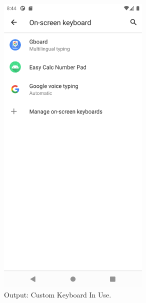 \documentclass[12pt, a4]{article}
\begin{document}
\subsection*{}
\begin{figure}[h]
\centering
\caption{Output: Custom Keyboard In Use.}
\includegraphics[height=15cm, width=7.3cm]{Calculator/Screenshots/Calculator-5.png}
\end{figure}

\newpage
\end{document}
